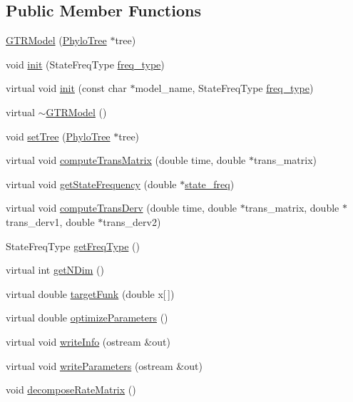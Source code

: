 \subsection*{Public Member Functions}
\begin{DoxyCompactItemize}
\item 
\hyperlink{classGTRModel_a6c79a459f383e64ee9540eaf8b854827}{GTRModel} (\hyperlink{classPhyloTree}{PhyloTree} $\ast$tree)
\item 
void \hyperlink{classGTRModel_a6a5736bfb839fca17dc6db2ee1cf91d5}{init} (StateFreqType \hyperlink{classGTRModel_a699318690979ff66c655dd3022d5127a}{freq\_\-type})
\item 
virtual void \hyperlink{classGTRModel_ad0625a75ce5e8f5fca7f65657b2677b8}{init} (const char $\ast$model\_\-name, StateFreqType \hyperlink{classGTRModel_a699318690979ff66c655dd3022d5127a}{freq\_\-type})
\item 
virtual \hyperlink{classGTRModel_aca20597dad26270745e2e82c771b5ee9}{$\sim$GTRModel} ()
\item 
void \hyperlink{classGTRModel_a121f6e38dae476820555a66ed3e6f10a}{setTree} (\hyperlink{classPhyloTree}{PhyloTree} $\ast$tree)
\item 
virtual void \hyperlink{classGTRModel_aa779b66b3824c4e956db7b56dee668c2}{computeTransMatrix} (double time, double $\ast$trans\_\-matrix)
\item 
virtual void \hyperlink{classGTRModel_aa7cdd1fb6852faccc185284c075c918b}{getStateFrequency} (double $\ast$\hyperlink{classGTRModel_a03c2ca5094d8c6563dbded5a05b26319}{state\_\-freq})
\item 
virtual void \hyperlink{classGTRModel_a9f6c7532d57b0e41d95dd95c5972cf5b}{computeTransDerv} (double time, double $\ast$trans\_\-matrix, double $\ast$trans\_\-derv1, double $\ast$trans\_\-derv2)
\item 
StateFreqType \hyperlink{classGTRModel_af2447a8e79a031706028d36beb6931bd}{getFreqType} ()
\item 
virtual int \hyperlink{classGTRModel_a6e2066898fbbb245596d4a97dd8ee33c}{getNDim} ()
\item 
virtual double \hyperlink{classGTRModel_ac32444cf94b5c3f3240aa344d4bc40b1}{targetFunk} (double x\mbox{[}$\,$\mbox{]})
\item 
virtual double \hyperlink{classGTRModel_a01c47ec7ac4b856e60aa3e4339e0044a}{optimizeParameters} ()
\item 
virtual void \hyperlink{classGTRModel_a233f9b473e4e3c549d801ff8a084e35e}{writeInfo} (ostream \&out)
\item 
virtual void \hyperlink{classGTRModel_a3dd6bc6cb405e76346eac7b813687a20}{writeParameters} (ostream \&out)
\item 
void \hyperlink{classGTRModel_ab73647f93c4fdde88c62a775586ae9ea}{decomposeRateMatrix} ()
\end{DoxyCompactItemize}
